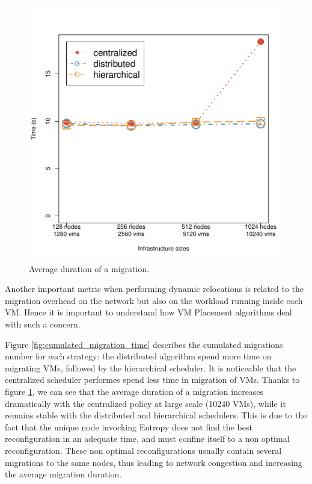 \begin{figure}[ht]
\begin{center}
    \includegraphics[width=.65\linewidth]{figures/experiments/migration_avg_duration.pdf}
    \caption{Average duration of a migration.}
\end{center}
\label{fig:avg_migration_time}
\end{figure}



Another important metric when performing dynamic relocations is
related to the migration overhead on the network but also on the
workload running inside each VM. Hence it is important to understand
how VM Placement algorithms deal with such a concern.

Figure \ref{fig:cumulated_migration_time} describes the cumulated migrations number for
each strategy: the distributed algorithm spend more time
on migrating VMs, followed by the hierarchical scheduler. It is noticeable that
the centralized scheduler performes spend less time in migration of VMs. Thanks
to figure \ref{fig:avg_migration_time}, we can see that the average duration
of a migration increases dramatically with the centralized policy at large scale
(10240 VMs), while it remains stable with the distributed and hierarchical
schedulers. This is due to the fact that the unique node invocking Entropy does
not find the best reconfiguration in an adequate time, and must confine itself
to a non optimal reconfiguration. These non optimal reconfigurations usually
contain several migrations to the same nodes, thus leading to network congestion
and increasing the average migration duration.


